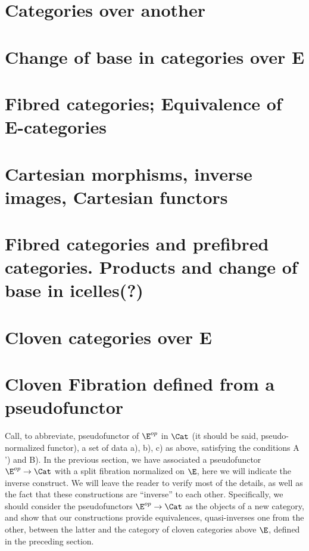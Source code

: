 \section{Categories over another}

\section{Change of base in categories over E}

\section{Fibred categories; Equivalence of E-categories}

\section{Cartesian morphisms, inverse images, Cartesian functors}

\section{Fibred categories and prefibred categories. Products and change of base in icelles(?)}

\section{Cloven categories over E}

\section{Cloven Fibration defined from a pseudofunctor}

Call, to abbreviate, pseudofunctor of $\E^{op}$ in $\Cat$ (it should be said, pseudo-normalized functor), a set of data a), b), c) as above, satisfying the conditions A ') and B). 
In the previous section, we have associated a pseudofunctor $\E^{op} \to \Cat$ with a split fibration normalized on $\E$, here we will indicate the inverse construct. 
We will leave the reader to verify most of the details, as well as the fact that these constructions are ``inverse'' to each other. 
Specifically, we should consider the pseudofunctors $\E^{op} \to \Cat$ as the objects of a new category, and show that our constructions provide equivalences, quasi-inverses one from the other, between the latter and the category of cloven categories above $\E$, defined in the preceding section.

